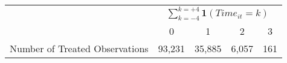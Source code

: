 \begin{tabular}{lcccc}
    \toprule
    & \multicolumn{4}{c}{$\sum_{k=-4}^{k=+4} \mathbf{1}(Time_{it} = k)$} \\
    \cmidrule(lr){2-5}
        &  0    &   1  &     2   &    3  \\
    \midrule
    Number of Treated Observations & 93,231   & 35,885  &  6,057  &   161   \\
    \bottomrule
    \end{tabular}